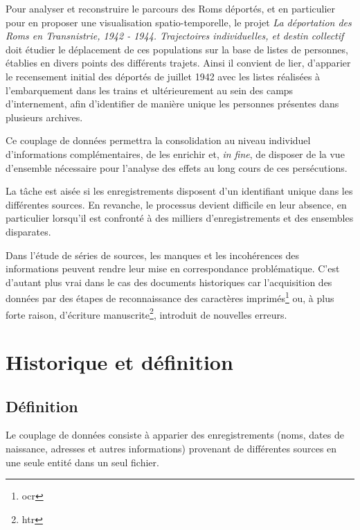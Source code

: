 \documentclass[a4paper,12pt,twoside]{book}
\begin{document}
	\vspace{-0.5cm}
	\label{chap1}
	
		Pour analyser et reconstruire le parcours des Roms déportés, et en particulier pour en proposer une visualisation spatio-temporelle, le projet \og{}\textit{La déportation des Roms en Transnistrie, 1942 - 1944. Trajectoires individuelles, et destin collectif}\fg{} doit étudier le déplacement de ces populations sur la base de listes de personnes, établies en divers points des différents trajets. Ainsi il convient de lier, d'apparier le recensement initial des déportés de juillet 1942 avec les listes réalisées à l'embarquement dans les trains et ultérieurement au sein des camps d'internement, afin d'identifier de manière unique les personnes présentes dans plusieurs archives.
		
		Ce couplage de données permettra la consolidation au niveau individuel d'informations complémentaires, de les enrichir et, \textit{in fine}, de disposer de la vue d'ensemble nécessaire pour l'analyse des effets au long cours de ces persécutions.

		La tâche est aisée si les enregistrements disposent d’un identifiant unique dans les différentes sources. En revanche, le processus devient difficile en leur absence, en particulier lorsqu'il est confronté à des milliers d'enregistrements et des ensembles disparates.
		
		Dans l'étude de séries de sources, les manques et les incohérences des informations peuvent rendre leur mise en correspondance problématique. C'est d'autant plus vrai dans le cas des documents historiques car l'acquisition des données par des étapes de reconnaissance des caractères imprimés\footnote{\gls{ocr}} ou, à plus forte raison, d'écriture manuscrite\footnote{\gls{htr}}, introduit de nouvelles erreurs.
		\pagebreak

		\section{Historique et définition}
		    
		    \subsection{Définition}

			    Le couplage de données consiste à apparier des enregistrements (noms, dates de naissance, adresses et autres informations) provenant de différentes sources en une seule entité dans un seul fichier.
		    
\end{document}
